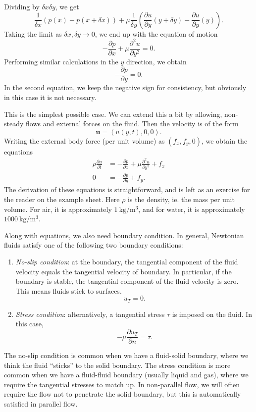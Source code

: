 \documentclass[a4paper]{article}
\begin{document}
Dividing by $\delta x \delta y$, we get
\[
  \frac{1}{\delta x}(p(x) - p(x + \delta x)) + \mu\frac{1}{\delta y}\left(\frac{\partial u}{\partial y}(y + \delta y) - \frac{\partial u}{\partial y}(y)\right).
\]
Taking the limit as $\delta x, \delta y \to 0$, we end up with the equation of motion
\[
  -\frac{\partial p}{\partial x} + \mu \frac{\partial^2 u}{\partial y^2} = 0.
\]
Performing similar calculations in the $y$ direction, we obtain
\[
  -\frac{\partial p}{\partial y} = 0.
\]
In the second equation, we keep the negative sign for consistency, but obviously in this case it is not necessary.

This is the simplest possible case. We can extend this a bit by allowing, non-steady flows and external forces on the fluid. Then the velocity is of the form
\[
  \mathbf{u} = (u(y, t), 0, 0).
\]
Writing the external body force (per unit volume) as $(f_x, f_y, 0)$, we obtain the equations
\begin{align*}
  \rho\frac{\partial u}{\partial t} &= -\frac{\partial p}{\partial x} + \mu \frac{\partial^2 u}{\partial y^2} + f_x\\
  0 &=-\frac{\partial p}{\partial y} + f_y.
\end{align*}
The derivation of these equations is straightforward, and is left as an exercise for the reader on the example sheet. Here $\rho$ is the density, ie. the mass per unit volume. For air, it is approximately $\SI{1}{\kilo\gram\per\meter\cubed}$, and for water, it is approximately $\SI{1000}{\kilo\gram\per\meter\cubed}$.

Along with equations, we also need boundary condition. In general, Newtonian fluids satisfy one of the following two boundary conditions:

\begin{enumerate}
  \item \emph{No-slip condition}: at the boundary, the tangential component of the fluid velocity equals the tangential velocity of boundary. In particular, if the boundary is stable, the tangential component of the fluid velocity is zero. This means fluids stick to surfaces.
    \[
      u_T = 0.\tag{1.5}
    \]
  \item \emph{Stress condition}: alternatively, a tangential stress $\tau$ is imposed on the fluid. In this case,
    \[
      -\mu \frac{\partial u_T}{\partial n} = \tau.
    \]
\end{enumerate}
The no-slip condition is common when we have a fluid-solid boundary, where we think the fluid ``sticks'' to the solid boundary. The stress condition is more common when we have a fluid-fluid boundary (usually liquid and gas), where we require the tangential stresses to match up. In non-parallel flow, we will often require the flow not to penetrate the solid boundary, but this is automatically satisfied in parallel flow.
\end{document}
